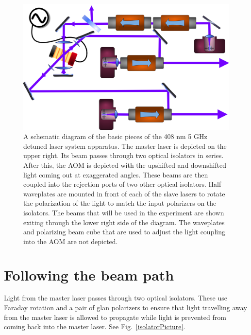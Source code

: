 \begin{figure}
    \centerline{\includegraphics[width=1\textwidth]{diagramOfSetup3}}
    \caption[Schematic diagram of the laser system]{\label{diagramOfSetup3}
	A schematic diagram of the basic pieces of the 408 nm 5 GHz detuned laser system apparatus. The master laser is depicted on the upper right. Its beam passes through two optical isolators in series. After this, the AOM is depicted with the upshifted and downshifted light coming out at exaggerated angles. These beams are then coupled into the rejection ports of two other optical isolators. Half waveplates are mounted in front of each of the slave lasers to rotate the polarization of the light to match the input polarizers on the isolators. The beams that will be used in the experiment are shown exiting through the lower right side of the diagram. The waveplates and polarizing beam cube that are used to adjust the light coupling into the AOM are not depicted.
    }
\end{figure}
\section{Following the beam path}
Light from the master laser passes through two optical isolators. These use Faraday rotation and a pair of glan polarizers to ensure that light travelling away from the master laser is allowed to propagate while light is prevented from coming back into the master laser. See Fig.~\ref{isolatorPicture}.

